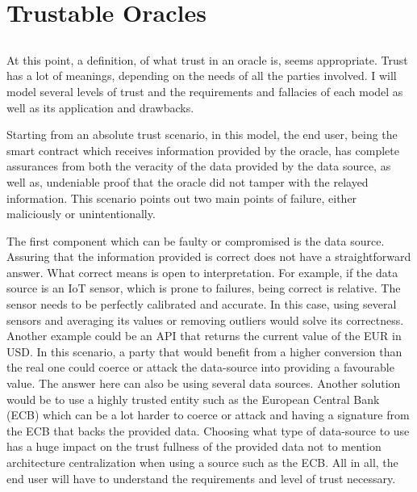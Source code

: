 \chapter{Trustable Oracles }\label{chap:chap5}

\section*{}

At this point, a definition, of what trust in an oracle is, seems appropriate. Trust has a lot of meanings, depending on the needs of all the parties involved. I will model several levels of trust and the requirements and fallacies of each model as well as its application and drawbacks.

Starting from an absolute trust scenario, in this model, the end user, being the smart contract which receives information provided by the oracle, has complete assurances from both the veracity of the data provided by the data source, as well as, undeniable proof that the oracle did not tamper with the relayed information. This scenario points out two main points of failure, either maliciously or unintentionally.

The first component which can be faulty or compromised is the data source. Assuring that the information provided is correct does not have a straightforward answer. What correct means is open to interpretation. For example, if the data source is an IoT sensor, which is prone to failures, being correct is relative. The sensor needs to be perfectly calibrated and accurate. In this case, using several sensors and averaging its values or removing outliers would solve its correctness. Another example could be an API that returns the current value of the EUR in USD. In this scenario, a party that would benefit from a higher conversion than the real one could coerce or attack the data-source into providing a favourable value. The answer here can also be using several data sources. Another solution would be to use a highly trusted entity such as the European Central Bank (ECB) which can be a lot harder to coerce or attack and having a signature from the ECB that backs the provided data. Choosing what type of data-source to use has a huge impact on the trust fullness of the provided data not to mention architecture centralization when using a source such as the ECB. All in all, the end user will have to understand the requirements and level of trust necessary.

